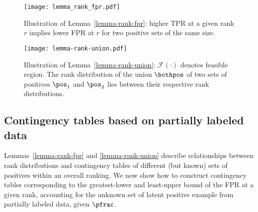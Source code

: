 \ifx
\begin{figure}[!h]
  \centering
  \RawFloats
  \begin{minipage}[b]{0.49\textwidth}
  \texttt{[image: lemma\_rank\_fpr.pdf]}
  \caption{Illustration of Lemma~\ref{lemma-rank-fpr}: higher TPR at a given rank $r$ implies lower FPR at $r$ for two positive sets of the same size.}
  \label{fig:lemma-rank-fpr}
  \vfill
  \end{minipage}
  \hfill
  \begin{minipage}[b]{0.49\textwidth}
  \texttt{[image: lemma-rank-union.pdf]}
  \caption{Illustration of Lemma~\ref{lemma-rank-union}: $\mathcal{F}(\cdot)$ denotes feasible region. The rank distribution of the union $\bothpos$ of two sets of positives $\pos_1$ and $\pos_2$ lies between their respective rank distributions.} 
  \label{fig:lemma-rank-union}
\vfill
  \end{minipage}
\end{figure}
\fi

\subsection{Contingency tables based on partially labeled data}
Lemmas~\ref*{lemma-rank-fpr} and \ref*{lemma-rank-union} describe relationships between rank distributions and contingency tables of different (but known) sets of positives within an overall ranking. 
We now show how to construct contingency tables corresponding to the greatest-lower and least-upper bound of the FPR at a given rank, accounting for the unknown set of latent positive example from partially labeled data, given $\pfrac$. 



